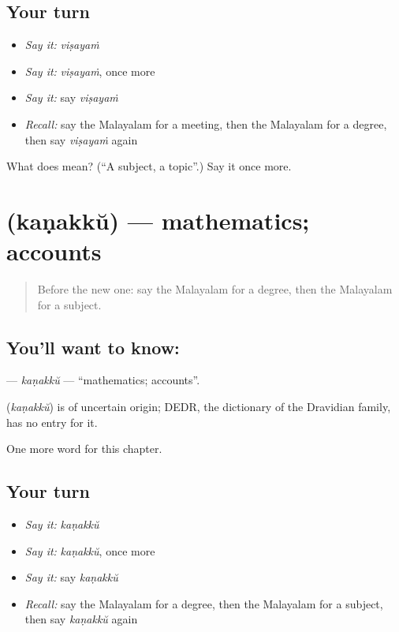 \subsection*{Your turn}
\begin{itemize}
\raggedright
  \item \emph{Say it:} \emph{viṣayaṁ}
  \item \emph{Say it:} \emph{viṣayaṁ}, once more
  \item \emph{Say it:} say \emph{viṣayaṁ}
  \item \emph{Recall:} say the Malayalam for a meeting, then the Malayalam for a degree, then say \emph{viṣayaṁ} again
\end{itemize}

\begin{tcolorbox}[breakable,colback=teal!4,colframe=teal!35!black,title={Before you move on}]
What does  mean? (\textquotedblleft{}A subject, a topic\textquotedblright{}.) Say it once more.
\end{tcolorbox}
\section[\texorpdfstring{\ml{കണക്ക്} (kaṇakkŭ)}{കണക്ക് (kaṇakkŭ)}]{ (kaṇakkŭ) — mathematics; accounts}

\label{lesson:ML-C335-kanakku}



\begin{quote}
Before the new one: say the Malayalam for a degree, then the Malayalam for a subject.
\end{quote}

\subsection*{You'll want to know: }
\textbf{} — \emph{kaṇakkŭ} — \textquotedblleft{}mathematics; accounts\textquotedblright{}.

\begin{cousinweb}
\textbf{} (\emph{kaṇakkŭ}) is of uncertain origin; DEDR, the dictionary of the Dravidian family, has no entry for it.
\end{cousinweb}

\begin{grammarlens}[title={What you've built}]
One more word for this chapter.
\end{grammarlens}

\subsection*{Your turn}
\begin{itemize}
\raggedright
  \item \emph{Say it:} \emph{kaṇakkŭ}
  \item \emph{Say it:} \emph{kaṇakkŭ}, once more
  \item \emph{Say it:} say \emph{kaṇakkŭ}
  \item \emph{Recall:} say the Malayalam for a degree, then the Malayalam for a subject, then say \emph{kaṇakkŭ} again
\end{itemize}


